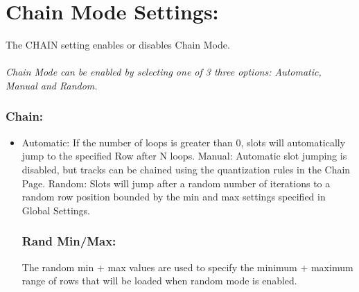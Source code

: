 \chapter{Chain Mode Settings:}
The CHAIN setting enables or disables Chain Mode.\\
\\
\textit{ Chain Mode can be enabled by selecting one of 3 three options: Automatic, Manual and Random.}
\\
\subsection{Chain:}
\begin{itemize}
\item Automatic: If the number of loops is greater than 0, slots will automatically jump to the specified Row after N loops.
\itme Manual: Automatic slot jumping is disabled, but tracks can be chained using the quantization rules in the Chain Page.
Random: Slots will jump after a random number of iterations to a random row position bounded by the min and max settings specified in Global Settings.\\
\itme \subsection{Rand Min/Max:}
The random min + max values are used to specify the minimum + maximum range of rows that will be loaded when random mode is enabled.
\end{itemize}
